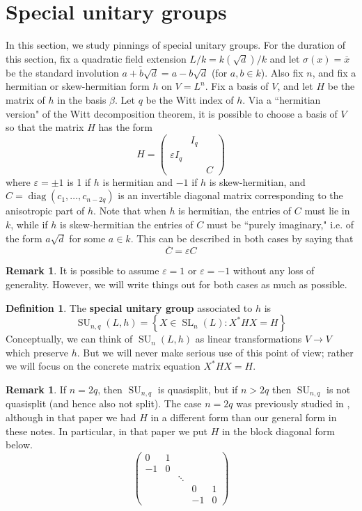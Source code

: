 \documentclass[12pt]{article}
\theoremstyle{definition}
\newtheorem{definition}[theorem]{Definition}
\newtheorem{remark}[theorem]{Remark}
\numberwithin{theorem}{subsection}
\newcommand{\sig}{\sigma}
\newcommand{\eps}{\varepsilon}
\newcommand{\lb}{\left\{}
\newcommand{\rb}{\right\}}
\newcommand{\tbf}{\textbf}
\newcommand{\ov}{\overline}
\DeclareMathOperator{\SL}{SL}
\DeclareMathOperator{\SU}{SU}
\DeclareMathOperator{\diag}{diag}
\begin{document}
\newpage
\section{Special unitary groups}

In this section, we study pinnings of special unitary groups. For the duration of this section, fix a quadratic field extension $L/k = k(\sqrt{d})/k$ and let $\sig(x) = \ov x$ be the standard involution $\ov{a+b \sqrt{d}} = a-b \sqrt{d}$ (for $a,b \in k$). Also fix $n$, and fix a hermitian or skew-hermitian form $h$ on $V = L^{n}$. Fix a basis of $V$, and let $H$ be the matrix of $h$ in the basis $\beta$. Let $q$ be the Witt index of $h$. Via a ``hermitian version" of the Witt decomposition theorem, it is possible to choose a basis of $V$ so that the matrix $H$ has the form
\[
	H =
	\begin{pmatrix}
		& I_q \\
		\eps I_q \\
		&& C
	\end{pmatrix}
\]
where $\eps = \pm 1$ is 1 if $h$ is hermitian and $-1$ if $h$ is skew-hermitian, and $C = \diag(c_1, \ldots, c_{n-2q})$ is an invertible diagonal matrix corresponding to the anisotropic part of $h$. Note that when $h$ is hermitian, the entries of $C$ must lie in $k$, while if $h$ is skew-hermitian the entries of $C$ must be ``purely imaginary," i.e. of the form $a \sqrt{d}$ for some $a \in k$. This can be described in both cases by saying that
\[
	\ov C = \eps C
\]

\begin{remark}
It is possible to assume $\eps = 1$ or $\eps = -1$ without any loss of generality. However, we will write things out for both cases as much as possible.
\end{remark}

\begin{definition}
The \tbf{special unitary group} associated to $h$ is
\[
	\SU_{n,q}(L,h) = \lb X \in \SL_{n}(L) : X^*H X = H \rb
\]
Conceptually, we can think of $\SU_{n}(L,h)$ as linear transformations $V \to V$ which preserve $h$. But we will never make serious use of this point of view; rather we will focus on the concrete matrix equation $X^*HX = H$.
\end{definition}

\begin{remark}
If $n=2q$, then $\SU_{n,q}$ is quasisplit, but if $n > 2q$ then $\SU_{n,q}$ is not quasisplit (and hence also not split). The case $n=2q$ was previously studied in \cite{Rapinchuk-Ruiter}, although in that paper we had $H$ in a different form than our general form in these notes. In particular, in that paper we put $H$ in the block diagonal form below.
\[
	\begin{pmatrix}
		0 & 1 \\
		-1 & 0 \\
		&& \ddots \\
		&&& 0 & 1 \\
		&&& -1 & 0
	\end{pmatrix}
\]
\end{remark}
\end{document}
